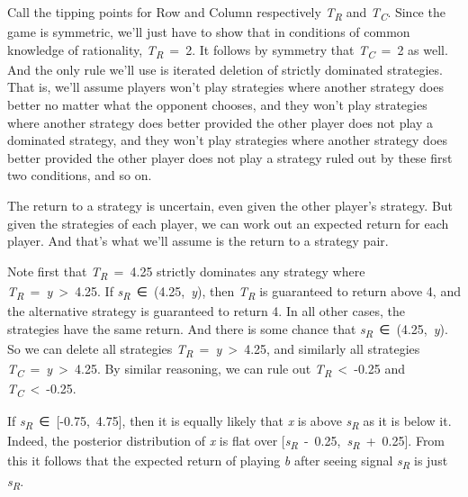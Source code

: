 \documentclass[
  10pt,
  letterpaper,
  DIV=11,
  numbers=noendperiod,
  twoside]{scrartcl}
\begin{document}
Call the tipping points for Row and Column respectively
\emph{T\textsubscript{R}} and \emph{T\textsubscript{C}}. Since the game
is symmetric, we'll just have to show that in conditions of common
knowledge of rationality, \emph{T\textsubscript{R}}~=~2. It follows by
symmetry that \emph{T\textsubscript{C}}~=~2 as well. And the only rule
we'll use is iterated deletion of strictly dominated strategies. That
is, we'll assume players won't play strategies where another strategy
does better no matter what the opponent chooses, and they won't play
strategies where another strategy does better provided the other player
does not play a dominated strategy, and they won't play strategies where
another strategy does better provided the other player does not play a
strategy ruled out by these first two conditions, and so on.

The return to a strategy is uncertain, even given the other player's
strategy. But given the strategies of each player, we can work out an
expected return for each player. And that's what we'll assume is the
return to a strategy pair.

Note first that \emph{T\textsubscript{R}}~=~4.25 strictly dominates any
strategy where \emph{T\textsubscript{R}}~=~\emph{y}~\textgreater~4.25.
If \emph{s\textsubscript{R}}~∈~(4.25,~\emph{y}), then
\emph{T\textsubscript{R}} is guaranteed to return above 4, and the
alternative strategy is guaranteed to return 4. In all other cases, the
strategies have the same return. And there is some chance that
\emph{s\textsubscript{R}}~∈~(4.25,~\emph{y}). So we can delete all
strategies \emph{T\textsubscript{R}}~=~\emph{y}~\textgreater~4.25, and
similarly all strategies
\emph{T\textsubscript{C}}~=~\emph{y}~\textgreater~4.25. By similar
reasoning, we can rule out \emph{T\textsubscript{R}}~\textless~-0.25 and
\emph{T\textsubscript{C}}~\textless~-0.25.

If \emph{s\textsubscript{R}}~∈~{[}-0.75,~4.75{]}, then it is equally
likely that \emph{x} is above \emph{s\textsubscript{R}} as it is below
it. Indeed, the posterior distribution of \emph{x} is flat over
{[}\emph{s\textsubscript{R}}~-~0.25,~\emph{s\textsubscript{R}}~+~0.25{]}.
From this it follows that the expected return of playing \emph{b} after
seeing signal \emph{s\textsubscript{R}} is just
\emph{s\textsubscript{R}}.
\end{document}
